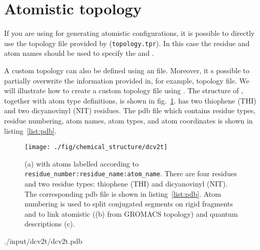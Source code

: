 \section{Atomistic topology}
\label{sec:atomistic}

If you are using \gromacs for generating atomistic configurations, it is possible to directly use the topology file provided by \gromacs (\texttt{topology.tpr}). In this case the \gromacs residue and atom names should be used to specify the  and . 

A custom topology can also be defined using an \xml file. Moreover, it s possible to partially overwrite the information provided in, for example, \gromacs topology file. We will illustrate how to create a custom topology file using \dcvt. The structure of \dcvt, together with atom type definitions, is shown in fig.~\ref{fig:dcv2t}. \dcvt has two thiophene (THI) and two dicyanovinyl (NIT) residues. The pdb file which contains residue types, residue numbering, atom names, atom types, and atom coordinates is shown in listing~\ref{list:pdb}.

\begin{figure}[ht]
\centering
\texttt{[image: ./fig/chemical\_structure/dcv2t]}
\caption{\small (a) \dcvt with atoms labelled according to \texttt{residue\_number:residue\_name:atom\_name}. 
There are four residues and two residue types: thiophene (THI) and dicyanovinyl (NIT). The corresponding pdb file is shown in listing~\ref{list:pdb}. 
Atom numbering is used to split conjugated segments on rigid fragments and to link atomistic ((b) from GROMACS topology) and quantum descriptions (c).}
\label{fig:dcv2t}
\end{figure}

%
{./input/dcv2t/dcv2t.pdb}
\vfill